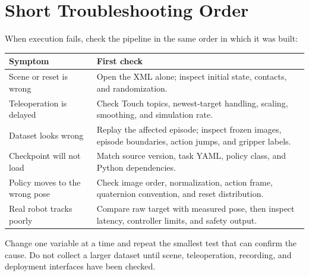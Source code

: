 \section{Short Troubleshooting Order}

When execution fails, check the pipeline in the same order in which it was
built:

\begin{table}[H]
  \centering
  \begin{tabularx}{\textwidth}{@{}p{}X@{}}
    \toprule
    \textbf{Symptom} & \textbf{First check} \\
    \midrule
    Scene or reset is wrong & Open the XML alone; inspect initial state, contacts, and randomization. \\
    Teleoperation is delayed & Check Touch topics, newest-target handling, scaling, smoothing, and simulation rate. \\
    Dataset looks wrong & Replay the affected episode; inspect frozen images, episode boundaries, action jumps, and gripper labels. \\
    Checkpoint will not load & Match source version, task YAML, policy class, and Python dependencies. \\
    Policy moves to the wrong pose & Check image order, normalization, action frame, quaternion convention, and reset distribution. \\
    Real robot tracks poorly & Compare raw target with measured pose, then inspect latency, controller limits, and safety output. \\
    \bottomrule
  \end{tabularx}
\end{table}

Change one variable at a time and repeat the smallest test that can confirm the
cause. Do not collect a larger dataset until scene, teleoperation, recording,
and deployment interfaces have been checked.
